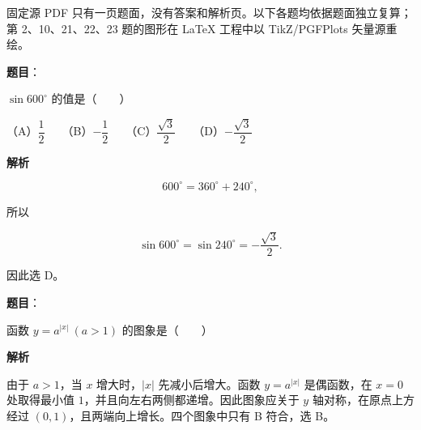 

\begin{gktip}
固定源 PDF 只有一页题面，没有答案和解析页。以下各题均依据题面独立复算；第 2、10、21、22、23 题的图形在 LaTeX 工程中以 TikZ/PGFPlots 矢量源重绘。
\end{gktip}

\begin{answer}

\textbf{题目}：

$\sin600^\circ$ 的值是\mbox{（　　）}

（A）$\dfrac12$　　（B）$-\dfrac12$　　（C）$\dfrac{\sqrt3}{2}$　　（D）$-\dfrac{\sqrt3}{2}$

\textbf{解析}

\nopagebreak[4]
\[
600^\circ=360^\circ+240^\circ,
\]

所以

\nopagebreak[4]
\[
\sin600^\circ=\sin240^\circ=-\frac{\sqrt3}{2}.
\]

因此选 D。


\end{answer}
\begin{answer}

\textbf{题目}：

函数 $y=a^{|x|}\ (a>1)$ 的图象是\mbox{（　　）}
\nopagebreak[4]
\begin{center}\end{center}
\nopagebreak[4]
\textbf{解析}

由于 $a>1$，当 $x$ 增大时，$|x|$ 先减小后增大。函数 $y=a^{|x|}$ 是偶函数，在 $x=0$ 处取得最小值 $1$，并且向左右两侧都递增。因此图象应关于 $y$ 轴对称，在原点上方经过 $(0,1)$，且两端向上增长。四个图象中只有 B 符合，选 B。


\end{answer}
